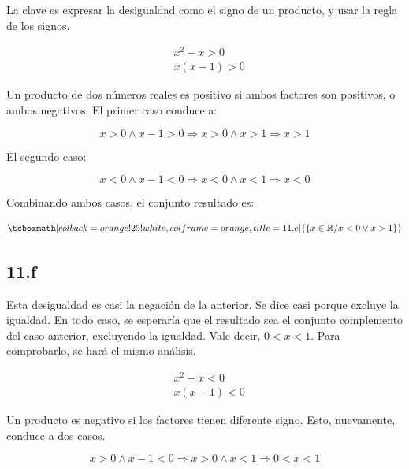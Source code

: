 \documentclass{article}
\newcommand{\hresult}[2]{\tcboxmath[colback=orange!25!white,colframe=orange, title=#1] {#2} }
\begin{document}
La clave es expresar la desigualdad como el signo de un producto, y usar la regla de los signos.

\begin{subequations}
\begin{align}
& x^2 - x > 0 \\
& x (x-1) > 0
\end{align}
\end{subequations}

Un producto de dos números reales es positivo si ambos factores son positivos, o ambos negativos. El primer caso conduce a:

\begin{equation}
x > 0 \wedge x - 1 > 0 \Rightarrow x > 0 \wedge x > 1 \Rightarrow x > 1
\end{equation}

El segundo caso:

\begin{equation}
x < 0 \wedge x - 1 < 0 \Rightarrow x < 0 \wedge x < 1 \Rightarrow x < 0
\end{equation}

Combinando ambos casos, el conjunto resultado es:

\begin{equation}
\hresult{11.e}{ \{ x \in \mathbb{R} / x < 0 \vee x > 1 \} }
\end{equation}

\subsection*{11.f}
\label{subsec:11.f}

Esta desigualdad es casi la negación de la anterior. Se dice casi porque excluye la igualdad. En todo caso, se esperaría que el resultado sea el conjunto complemento del caso anterior, excluyendo la igualdad. Vale decir, $ 0 < x <1 $. Para comprobarlo, se hará el mismo análisis.

\begin{subequations}
\begin{align}
& x^2 - x < 0 \\
& x (x-1) < 0
\end{align}
\end{subequations}

Un producto es negativo si los factores tienen diferente signo. Esto, nuevamente, conduce a dos casos.

\begin{equation}
x > 0 \wedge x - 1 < 0 \Rightarrow x > 0 \wedge x < 1 \Rightarrow 0 < x < 1
\end{equation}
\end{document}
